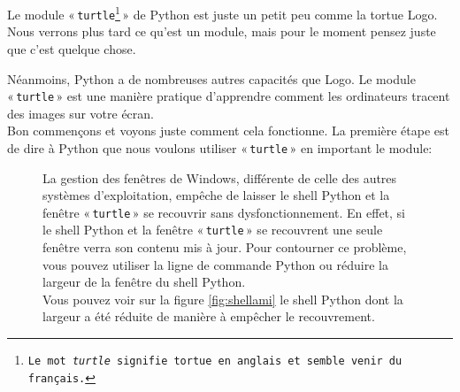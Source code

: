Le module « \texttt{turtle\footnote{Le mot \emph{turtle} signifie tortue en anglais et semble venir du français.}} » de Python est juste un petit peu comme la tortue Logo.
Nous verrons plus tard ce qu'est un module, mais 
pour le moment pensez juste que c'est quelque chose.

Néanmoins, Python a de nombreuses autres capacités que Logo. Le module « \texttt{turtle} » est une manière pratique 
 d'apprendre comment les ordinateurs tracent des images sur votre écran.\\

Bon commençons et voyons juste comment cela fonctionne. La première étape est de dire à Python que nous voulons utiliser « \texttt{turtle} » en important le module:

\begin{figure}[ht]
\begin{minipage}{0.4\linewidth}
La gestion des fenêtres de Windows, différente de celle des autres systèmes d'exploitation, empêche de laisser le shell Python et la fenêtre « \texttt{turtle} » se recouvrir sans dysfonctionnement. En effet, si le shell Python et la fenêtre « \texttt{turtle} » se recouvrent une seule fenêtre verra son contenu mis à jour. Pour contourner ce problème, vous pouvez utiliser la ligne de commande Python ou réduire la largeur de la fenêtre du shell Python.\\

Vous pouvez voir sur la figure \ref{fig:shellami} le shell Python dont la largeur a été réduite de manière à empêcher le recouvrement.\\


\end{minipage}
\end{figure}
